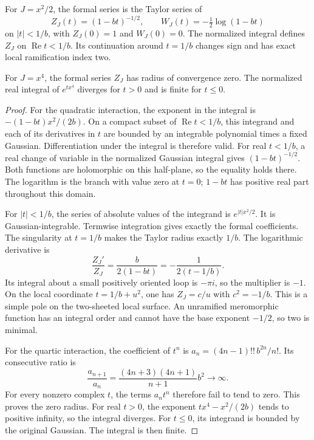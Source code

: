 \begin{proposition}
\label{prop:da-gaussian}
For $J=x^2/2$, the formal series is the Taylor series of
\[
 Z_J(t)=(1-bt)^{-1/2},\qquad
 W_J(t)=-\tfrac12\log(1-bt)
\]
on $|t|<1/b$, with $Z_J(0)=1$ and $W_J(0)=0$.
The normalized integral defines $Z_J$ on $\operatorname{Re}t<1/b$.
Its continuation around $t=1/b$ changes sign and has exact local
ramification index two.

For $J=x^4$, the formal series $Z_J$ has radius of convergence zero.
The normalized real integral of $e^{tx^4}$ diverges for $t>0$ and
is finite for $t\leq0$.
\end{proposition}
\begin{proof}
For the quadratic interaction, the exponent in the integral is
$-(1-bt)x^2/(2b)$. On a compact subset of
$\operatorname{Re}t<1/b$, this integrand and each of its derivatives
in $t$ are bounded by an integrable polynomial times a fixed Gaussian.
Differentiation under the integral is therefore valid.
For real $t<1/b$, a real change of variable in the normalized
Gaussian integral gives $(1-bt)^{-1/2}$.
Both functions are holomorphic on this half-plane, so the equality
holds there. The logarithm is the branch with value zero at $t=0$;
$1-bt$ has positive real part throughout this domain.

For $|t|<1/b$, the series of absolute values of the integrand is
$e^{|t|x^2/2}$. It is Gaussian-integrable. Termwise integration gives
exactly the formal coefficients. The singularity at $t=1/b$ makes
the Taylor radius exactly $1/b$.
The logarithmic derivative is
\[
 \frac{Z_J'}{Z_J}=\frac{b}{2(1-bt)}
                  =-\frac1{2(t-1/b)}.
\]
Its integral about a small positively oriented loop is $-\pi i$,
so the multiplier is $-1$. On the local coordinate
$t=1/b+u^2$, one has $Z_J=c/u$ with $c^2=-1/b$.
This is a simple pole on the two-sheeted local surface. An unramified
meromorphic function has an integral order and cannot have the
base exponent $-1/2$, so two is minimal.

For the quartic interaction, the coefficient of $t^n$ is
$a_n=(4n-1)!!\,b^{2n}/n!$. Its consecutive ratio is
\[
 \frac{a_{n+1}}{a_n}
 =\frac{(4n+3)(4n+1)}{n+1}b^2\longrightarrow\infty.
\]
For every nonzero complex $t$, the terms $a_nt^n$ therefore fail
to tend to zero. This proves the zero radius.
For real $t>0$, the exponent $tx^4-x^2/(2b)$ tends to positive
infinity, so the integral diverges. For $t\leq0$, its integrand is
bounded by the original Gaussian. The integral is then finite.
\end{proof}

